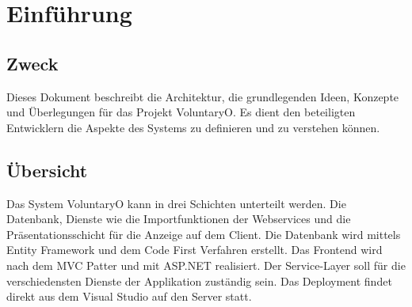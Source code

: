 \chapter{Einführung}
	\section{Zweck}
	Dieses Dokument beschreibt die Architektur, die grundlegenden Ideen, Konzepte und Überlegungen für das Projekt VoluntaryO. Es dient den beteiligten Entwicklern die Aspekte des Systems zu definieren und zu verstehen können.
	
	
	\section{Übersicht}
	Das System VoluntaryO kann in drei Schichten unterteilt werden. Die Datenbank, Dienste wie die Importfunktionen der Webservices und die Präsentationsschicht für die Anzeige auf dem Client.
	Die Datenbank wird mittels Entity Framework und dem Code First Verfahren erstellt. Das Frontend wird nach dem MVC Patter und mit ASP.NET realisiert. Der Service-Layer soll für die verschiedensten Dienste der Applikation zuständig sein.
	Das Deployment findet direkt aus dem Visual Studio auf den Server statt.
